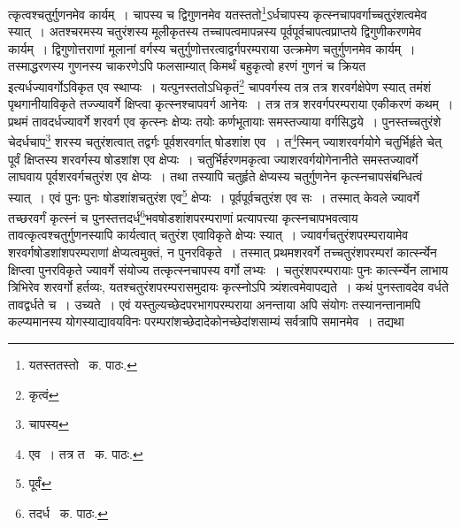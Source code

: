 \documentclass[11pt, openany]{book}
\begin{document}
\begin{sloppypar}
\noindent त्कृत्वश्चतुर्गुणनमेव कार्यम्~। चापस्य च द्विगुणनमेव यतस्ततो\renewcommand{\thefootnote}{१}\footnote{यतस्ततस्तो \textendash\ क. पाठः.}ऽर्धचापस्य कृत्स्नचापवर्गाच्चतुरंशत्वमेव स्यात्~। अतश्चरमस्य चतुरंशस्य मूलीकृतस्य तच्चापत्वमापन्नस्य पूर्वपूर्वचापत्वप्राप्तये द्विगुणीकरणमेव कार्यम्~। द्विगुणोत्तराणां मूलानां वर्गस्य चतुर्गुणोत्तरत्वाद्वर्गपरम्पराया उत्क्रमेण चतुर्गुणनमेव कार्यम्~। तस्माद्धरणस्य गुणनस्य चाकरणेऽपि फलसाम्यात् किमर्थं बहुकृत्वो हरणं गुणनं च क्रियत इत्यर्धज्यावर्गोऽविकृत एव स्थाप्यः~। यत्पुनस्ततोऽधिकृतं\renewcommand{\thefootnote}{२}\footnote{कृत्वं} चापवर्गस्य तत्र तत्र शरवर्गक्षेपेण स्यात् तमंशं पृथगानीयाविकृते तज्ज्यावर्गे क्षिप्त्वा कृत्स्नश्चापवर्ग आनेयः~। तत्र तत्र शरवर्गपरम्पराया एकीकरणं कथम्~। प्रथमं तावदर्धज्यावर्गे शरवर्ग एव कृत्स्नः क्षेप्यः तयोः कर्णभूतायाः समस्तज्याया वर्गसिद्धये~। पुनस्तच्चतुरंशे चेदर्धचाप\renewcommand{\thefootnote}{३}\footnote{चापस्य} शरस्य चतुरंशत्वात् तद्वर्गः पूर्वशरवर्गात् षोडशांश एव~। त\renewcommand{\thefootnote}{४}\footnote{एव~। तत्र त \textendash\ क. पाठः.}स्मिन् ज्याशरवर्गयोगे चतुर्भिर्हृते चेत् पूर्वं क्षिप्तस्य शरवर्गस्य षोडशांश एव क्षेप्यः~। चतुर्भिर्हरणमकृत्वा ज्याशरवर्गयोगेनानीते समस्तज्यावर्गे लाघवाय पूर्वशरवर्गचतुरंश एव क्षेप्यः~। तथा तस्यापि चतुर्हृते क्षेप्यस्य चतुर्गुणनेन कृत्स्नचापसंबन्धित्वं स्यात्~। एवं पुनः पुनः षोडशांशचतुरंश एव\renewcommand{\thefootnote}{५}\footnote{पूर्वं} क्षेप्यः~। पूर्वपूर्वचतुरंश एव सः~। तस्मात् केवले ज्यावर्गे तच्छरवर्गं कृत्स्नं च पुनस्तत्तदर्ध\renewcommand{\thefootnote}{६}\footnote{तदर्ध \textendash\ क. पाठः.}भवषोडशांशपरम्पराणां प्रत्यापत्त्या कृत्स्नचापभवत्वाय तावत्कृत्वश्चतुर्गुणनस्यापि कार्यत्वात् चतुरंश एवाविकृते क्षेप्यः स्यात्~। ज्यावर्गचतुरंशपरम्परायामेव शरवर्गषोडशांशपरम्पराणां क्षेप्यत्वमुक्तं, न पुनरविकृते~। तस्मात् प्रथमशरवर्गे
तच्चतुरंशपरम्परां कार्त्स्न्येन क्षिप्त्वा पुनरविकृते ज्यावर्गे संयोज्य तत्कृत्स्नचापस्य वर्गो लभ्यः~। चतुरंशपरम्परायाः पुनः कार्त्स्न्येन लाभाय त्रिभिरेव शरवर्गो हर्तव्यः, यतश्चतुरंशपरम्परासमुदायः कृत्स्नोऽपि त्र्यंशत्वमेवापद्यते~। कथं पुनस्तावदेव वर्धते तावद्वर्धते च~। उच्यते~। एवं यस्तुल्यच्छेदपरभागपरम्पराया अनन्ताया अपि संयोगः तस्यानन्तानामपि कल्प्यमानस्य योगस्याद्यावयविनः परम्परांशच्छेदादेकोनच्छेदांशसाम्यं सर्वत्रापि समानमेव~। तद्यथा\textendash
\end{sloppypar} 

\newpage
\end{document}
